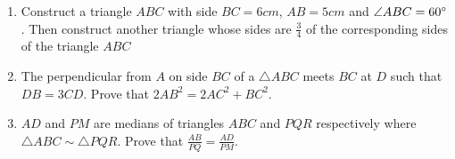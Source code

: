 \begin{enumerate}
\item Construct a triangle $ABC$ with side $BC = 6 cm$, $AB = 5 cm$ and $\angle ABC = 60\degree$. Then construct another triangle whose sides are $\frac{3}{4}$ of the corresponding sides of the triangle $ABC$

\item The perpendicular from $A$ on side $BC$ of a $\triangle ABC$ meets $BC$ at $D$ such that
$DB = 3CD$. Prove that $2AB^2 = 2AC^2 + BC^2$.

\item $AD$ and $PM$ are medians of triangles $ABC$ and $PQR$ respectively where
$\triangle ABC \sim \triangle PQR$. Prove that ${\frac {AB}{PQ}} = {\frac {AD}{PM}}$.

\end{enumerate}
